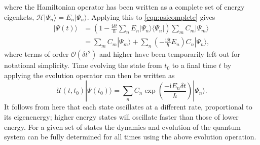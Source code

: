 where the Hamiltonian operator has been written as a complete set of energy eigenkets, $\mathcal{H}|\Psi_n\rangle = E_n|\Psi_n\rangle$. Applying this to \eqref{eqn:psicomplete} gives
\begin{subequations}
    \begin{align}
        |\Psi (t) \rangle &= \left( 1 - \frac{\textrm{i}\delta t}{\hbar}\displaystyle\sum\limits_{n}E_n|\Psi_n\rangle\langle \Psi_n |  \right)\displaystyle\sum\limits_{m} C_m |\Psi_m \rangle \\
            &= \displaystyle\sum\limits_{m} C_m |\Psi_m \rangle + \displaystyle\sum\limits_{n}\left( - \frac{\textrm{i}\delta t}{\hbar}E_n \right) C_n|\Psi_n\rangle,
    \end{align}
\end{subequations}
where terms of order $\mathcal{O}(\delta t^2)$ and higher have been temporarily left out for notational simplicity. Time evolving the state from $t_0$ to a final time $t$ by applying the evolution operator can then be written as
\begin{equation}
   \mathscr{U}(t,t_0)|\Psi(t_0) \rangle = \displaystyle\sum\limits_{n} C_n \exp\left(\frac{-\textrm{i}{E_n}\delta t}{\hbar}\right)|\Psi_n \rangle.
\end{equation}
It follows from here that each state oscillates at a different rate, proportional to its eigenenergy; higher energy states will oscillate faster than those of lower energy. For a given set of states the dynamics and evolution of the quantum system can be fully determined for all times using the above evolution operation.

